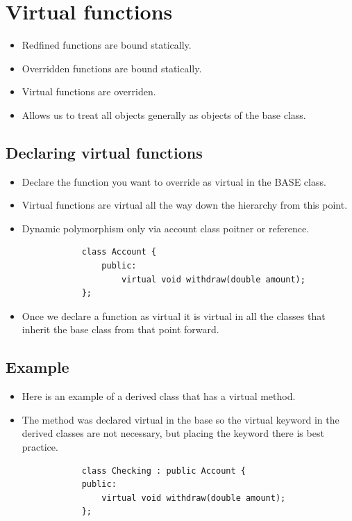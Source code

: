 \section{Virtual functions}
\begin{itemize}
    \item Redfined functions are bound statically.
    \item Overridden functions are bound statically.
    \item Virtual functions are overriden.
    \item Allows us to treat all objects generally as objects of the base class.
\end{itemize}

\subsection{Declaring virtual functions}
\begin{itemize}
    \item Declare the function you want to override as virtual in the BASE class.
    \item Virtual functions are virtual all the way down the hierarchy from this point.
    \item Dynamic polymorphism only via account class poitner or reference.
        \begin{verbatim}
            class Account {
                public:
                    virtual void withdraw(double amount);
            };
        \end{verbatim}
    
    \item Once we declare a function as virtual it is virtual in all the classes that inherit the base class from that point forward.
\end{itemize}


\subsection{Example}
\begin{itemize}
    \item Here is an example of a derived class that has a virtual method. 
    \item The method was declared virtual in the base so the virtual keyword in the derived classes are not necessary, but placing the keyword there is best practice.
        \begin{verbatim}
            class Checking : public Account {
            public:
                virtual void withdraw(double amount);
            };
        \end{verbatim}
\end{itemize}


